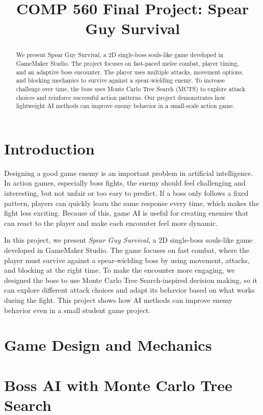 \documentclass{article}
\title{COMP 560 Final Project: Spear Guy Survival}
\begin{document}
\maketitle

\begin{abstract}
We present Spear Guy Survival, a 2D single-boss souls-like game developed in GameMaker Studio. The project focuses on fast-paced melee combat, player timing, and an adaptive boss encounter. The player uses multiple attacks, movement options, and blocking mechanics to survive against a spear-wielding enemy. To increase challenge over time, the boss uses Monte Carlo Tree Search (MCTS) to explore attack choices and reinforce successful action patterns. Our project demonstrates how lightweight AI methods can improve enemy behavior in a small-scale action game.
\end{abstract}

\section{Introduction}

Designing a good game enemy is an important problem in artificial intelligence. In action games, especially boss fights, the enemy should feel challenging and interesting, but not unfair or too easy to predict. If a boss only follows a fixed pattern, players can quickly learn the same response every time, which makes the fight less exciting. Because of this, game AI is useful for creating enemies that can react to the player and make each encounter feel more dynamic.

In this project, we present \textit{Spear Guy Survival}, a 2D single-boss souls-like game developed in GameMaker Studio. The game focuses on fast combat, where the player must survive against a spear-wielding boss by using movement, attacks, and blocking at the right time. To make the encounter more engaging, we designed the boss to use Monte Carlo Tree Search-inspired decision making, so it can explore different attack choices and adapt its behavior based on what works during the fight. This project shows how AI methods can improve enemy behavior even in a small student game project.

\section{Game Design and Mechanics}

\section{Boss AI with Monte Carlo Tree Search}
\end{document}
